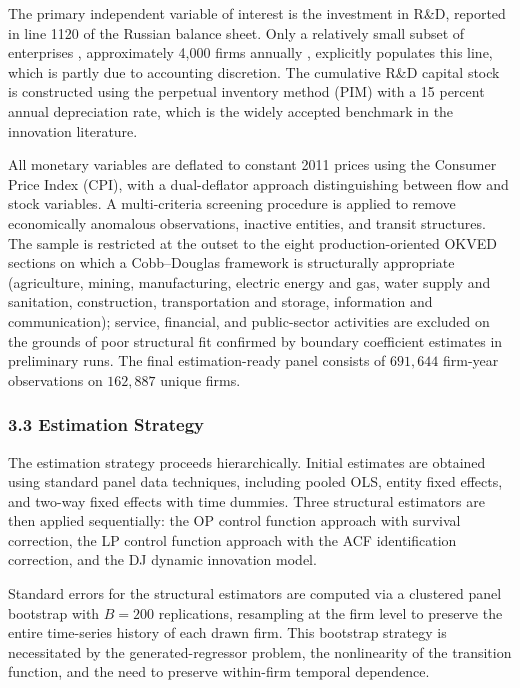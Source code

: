 \documentclass[a4paper, 12pt]{article}
\begin{document}
The primary independent variable of interest is the investment in R\&D, reported in line 1120 of the Russian balance sheet. Only a relatively small subset of enterprises , approximately 4,000 firms annually , explicitly populates this line, which is partly due to accounting discretion. The cumulative R\&D capital stock is constructed using the perpetual inventory method (PIM) with a 15 percent annual depreciation rate, which is the widely accepted benchmark in the innovation literature.

All monetary variables are deflated to constant 2011 prices using the Consumer Price Index (CPI), with a dual-deflator approach distinguishing between flow and stock variables. A multi-criteria screening procedure is applied to remove economically anomalous observations, inactive entities, and transit structures. The sample is restricted at the outset to the eight production-oriented OKVED sections on which a Cobb--Douglas framework is structurally appropriate (agriculture, mining, manufacturing, electric energy and gas, water supply and sanitation, construction, transportation and storage, information and communication); service, financial, and public-sector activities are excluded on the grounds of poor structural fit confirmed by boundary coefficient estimates in preliminary runs. The final estimation-ready panel consists of $691{,}644$ firm-year observations on $162{,}887$ unique firms.

\subsubsection{3.3 Estimation Strategy}

The estimation strategy proceeds hierarchically. Initial estimates are obtained using standard panel data techniques, including pooled OLS, entity fixed effects, and two-way fixed effects with time dummies. Three structural estimators are then applied sequentially: the OP control function approach with survival correction, the LP control function approach with the ACF identification correction, and the DJ dynamic innovation model.

Standard errors for the structural estimators are computed via a clustered panel bootstrap with $B = 200$ replications, resampling at the firm level to preserve the entire time-series history of each drawn firm. This bootstrap strategy is necessitated by the generated-regressor problem, the nonlinearity of the transition function, and the need to preserve within-firm temporal dependence.
\end{document}

